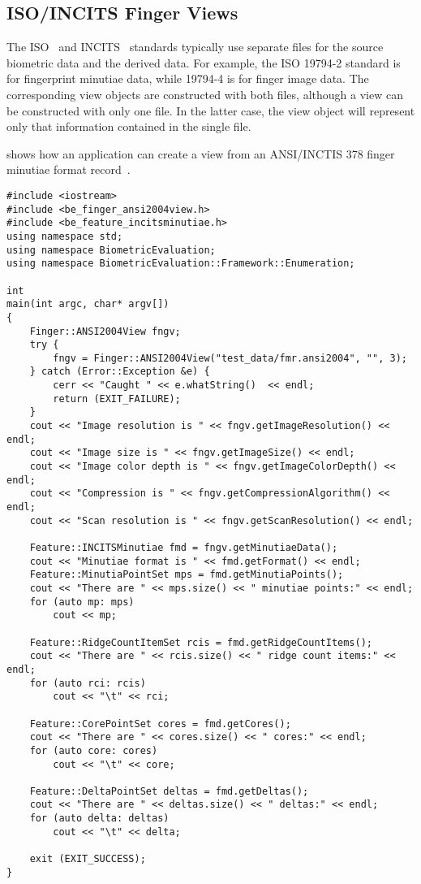 \subsection{ISO/INCITS Finger Views}
\label{sec-incitsfingerviews}

The ISO~\cite{org:iso:sc37} and INCITS~\cite{org:incits} standards typically use
separate files for the source biometric data and the derived data. For example,
the ISO 19794-2 standard is for fingerprint minutiae data, while 19794-4 is for
finger image data. The corresponding \sname view objects are constructed with
both files, although a view can be constructed with only one file. In the
latter case, the view object will represent only that information contained in
the single file.


 shows how an application can create a view from
an ANSI/INCTIS 378 finger minutiae format record~\cite{std:ansi378-2004}.

\begin{lstlisting}[caption={Using an INCITS Finger View}, label=lst:incitsfingerviewuse]
#include <iostream>
#include <be_finger_ansi2004view.h>
#include <be_feature_incitsminutiae.h>
using namespace std;
using namespace BiometricEvaluation;
using namespace BiometricEvaluation::Framework::Enumeration;

int
main(int argc, char* argv[])
{
    Finger::ANSI2004View fngv;
    try {
        fngv = Finger::ANSI2004View("test_data/fmr.ansi2004", "", 3);
    } catch (Error::Exception &e) {
        cerr << "Caught " << e.whatString()  << endl;
        return (EXIT_FAILURE);
    }
    cout << "Image resolution is " << fngv.getImageResolution() << endl;
    cout << "Image size is " << fngv.getImageSize() << endl;
    cout << "Image color depth is " << fngv.getImageColorDepth() << endl;
    cout << "Compression is " << fngv.getCompressionAlgorithm() << endl;
    cout << "Scan resolution is " << fngv.getScanResolution() << endl;
    
    Feature::INCITSMinutiae fmd = fngv.getMinutiaeData();
    cout << "Minutiae format is " << fmd.getFormat() << endl;
    Feature::MinutiaPointSet mps = fmd.getMinutiaPoints();
    cout << "There are " << mps.size() << " minutiae points:" << endl;
    for (auto mp: mps)
        cout << mp;

    Feature::RidgeCountItemSet rcis = fmd.getRidgeCountItems();
    cout << "There are " << rcis.size() << " ridge count items:" << endl;
    for (auto rci: rcis)
        cout << "\t" << rci;

    Feature::CorePointSet cores = fmd.getCores();
    cout << "There are " << cores.size() << " cores:" << endl;
    for (auto core: cores)
        cout << "\t" << core;

    Feature::DeltaPointSet deltas = fmd.getDeltas();
    cout << "There are " << deltas.size() << " deltas:" << endl;
    for (auto delta: deltas)
        cout << "\t" << delta;

    exit (EXIT_SUCCESS);
}
\end{lstlisting}
